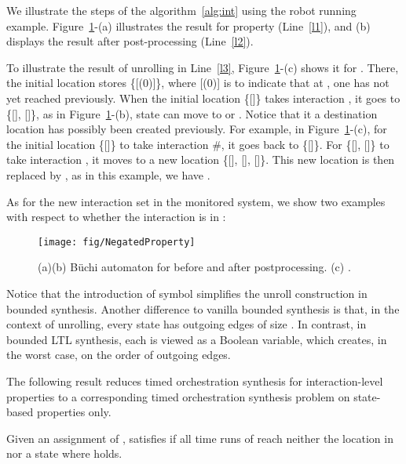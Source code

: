 \begin{example}
We illustrate the steps of the algorithm~\ref{alg:int} using the robot running example. 
Figure~\ref{fig:negated.property}-(a) illustrates the
result  for property 
(Line~\ref{l1}), and  (b) displays the result after post-processing
(Line~\ref{l2})\@. 

To illustrate the result of unrolling in Line~\ref{l3},
Figure~\ref{fig:negated.property}-(c) shows it for . There, the
initial location stores \{[(0)]\}, where [(0)] is to
indicate that at , one has not yet reached  previously. When
the initial location \{[]\} takes interaction
, it goes to \{[], []\}, as in
Figure~\ref{fig:negated.property}-(b), state  can move to 
or . Notice  that it a destination location has possibly been created previously. 
For example, in
Figure~\ref{fig:negated.property}-(c), for the initial location
\{[]\} to take interaction \#, it goes back to
\{[]\}. For
\{[], []\} to take interaction ,
it moves to a new location \{[], [],
[]\}. This new location is then replaced by ,
as in this example, we have .

As for the new interaction set in the monitored system, we show two
examples with respect to whether the interaction is in :


\end{example}	

\begin{figure}[htp]
\centering
\texttt{[image: fig/NegatedProperty]}
\caption{(a)(b) B\"uchi automaton for  before and
  after postprocessing. (c) 
.
}
\label{fig:negated.property}
\end{figure}
Notice that the introduction of  symbol simplifies the unroll construction in bounded synthesis. 
Another difference to vanilla bounded synthesis is that, in the context of unrolling, every state
has outgoing edges of size . 
In contrast, in  bounded LTL synthesis, each  is viewed as a Boolean
variable, which creates, in the worst case, on the order of  outgoing edges.

The following result reduces timed orchestration synthesis for interaction-level properties to a corresponding timed orchestration synthesis problem on state-based properties only.
\begin{lemma}
\label{lem:correct}
  Given  an assignment of ,  satisfies  if all time runs of  reach neither the location  in  nor a state where  holds. 


\end{lemma}


